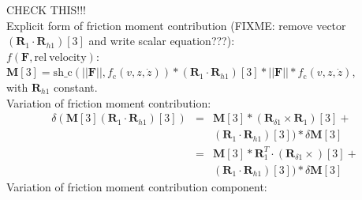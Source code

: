 \documentclass[10pt,fleqn,subeqn]{report}
\newcommand{\T}[1]{\bm{#1}}
\begin{document}
CHECK THIS!!!\\
Explicit form of friction moment contribution 
(FIXME: remove vector $(\T R_1\cdot \T R_{h1})[3]$ and write scalar equation???):\\
$f(\T F, \mathrm{rel\ velocity})$:
$\T M[3] = \mathrm{sh\_c}(||\T F||, f_{\mathrm{c}}(v,z,\dot{z})) * (\T R_1\cdot \T R_{h1})[3] * 
	||\T F|| * f_{\mathrm{c}}(v,z,\dot{z})$,\\
with $\T R_{h1}$ constant.\\
Variation of friction moment contribution:
\begin{eqnarray*}
\delta (\T M[3] (\T R_1\cdot \T R_{h1})[3])
	&=& \T M[3] * (\T R_{\delta 1} \times \T R_1)[3]+\\
	&& (\T R_1\cdot \T R_{h1})[3]) * \delta \T M[3]\\
	&=& \T M[3] * \T R_1^T \cdot (\T R_{\delta 1} \times )[3]+\\
	&& (\T R_1\cdot \T R_{h1})[3]) * \delta \T M[3]
\end{eqnarray*}
Variation of friction moment contribution component:
\end{document}
